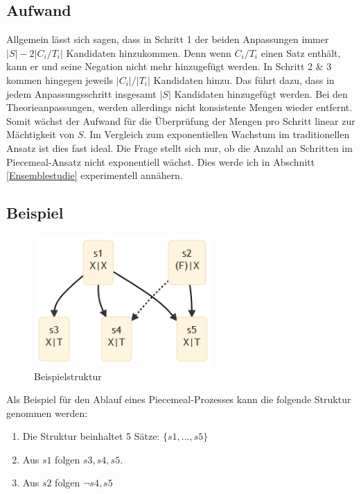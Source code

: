 \documentclass{article}
\begin{document}
\subsection{Aufwand}
Allgemein lässt sich sagen, dass in Schritt 1 der beiden Anpassungen immer $\lvert S \rvert - 2\lvert C_i/T_i \rvert$ Kandidaten hinzukommen. Denn wenn $C_i/T_i$ einen Satz enthält, kann er und seine Negation nicht mehr hinzugefügt werden. In Schritt 2 \& 3 kommen hingegen jeweils $\lvert C_i \rvert / \lvert T_i \rvert$ Kandidaten hinzu. Das führt dazu, dass in jedem Anpassungsschritt insgesamt $\lvert S \rvert$ Kandidaten hinzugefügt werden. Bei den Theorieanpassungen, werden allerdings nicht konsistente Mengen wieder entfernt. Somit wächst der Aufwand für die Überprüfung der Mengen pro Schritt linear zur Mächtigkeit von $S$. Im Vergleich zum exponentiellen Wachstum im traditionellen Ansatz ist dies fast ideal. Die Frage stellt sich nur, ob die Anzahl an Schritten im Piecemeal-Ansatz nicht exponentiell wächst. Dies werde ich in Abschnitt \ref{Ensemblestudie} experimentell annähern.

\subsection{Beispiel}
\begin{figure}[ht]
  \centering
  \includegraphics[width=\textwidth,height=5cm,keepaspectratio]{images/reduced_classical.png}
  \caption{Beispielstruktur\label{fig:classset-initial1}}
\end{figure}

 Als Beispiel für den Ablauf eines Piecemeal-Prozesses kann die folgende Struktur genommen werden:
 \begin{enumerate}
     \item Die Struktur beinhaltet 5 Sätze: $\{s1,...,s5\}$
     \item Aus $s1$ folgen $s3, s4, s5$.
     \item Aus $s2$ folgen $\neg s4, s5$
 \end{enumerate}
 
\end{document}
